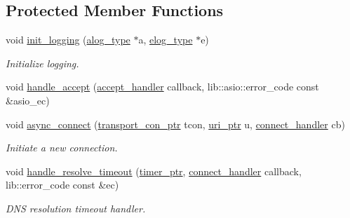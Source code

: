 \subsection*{Protected Member Functions}
\begin{DoxyCompactItemize}
\item 
void \hyperlink{classwebsocketpp_1_1transport_1_1asio_1_1endpoint_a26ad1ad26277ed99a691559e69d47932}{init\+\_\+logging} (\hyperlink{classwebsocketpp_1_1transport_1_1asio_1_1endpoint_acba708e66a47d4aae9a053d364585b81}{alog\+\_\+type} $\ast$a, \hyperlink{classwebsocketpp_1_1transport_1_1asio_1_1endpoint_a2aa93730c801602b55b585121a2898c0}{elog\+\_\+type} $\ast$e)
\begin{DoxyCompactList}\small\item\em Initialize logging. \end{DoxyCompactList}\item 
void \hyperlink{classwebsocketpp_1_1transport_1_1asio_1_1endpoint_a8154dd7191c0d8df984a202bc2e54cf7}{handle\+\_\+accept} (\hyperlink{namespacewebsocketpp_1_1transport_a9326ea831379368ee47841b2e46cb009}{accept\+\_\+handler} callback, lib\+::asio\+::error\+\_\+code const \&asio\+\_\+ec)
\item 
void \hyperlink{classwebsocketpp_1_1transport_1_1asio_1_1endpoint_a1ca12e4d72c691e6cc1ce1f5316e3243}{async\+\_\+connect} (\hyperlink{classwebsocketpp_1_1transport_1_1asio_1_1endpoint_ac5fc306f32d15f92dd1b22366eaba62d}{transport\+\_\+con\+\_\+ptr} tcon, \hyperlink{namespacewebsocketpp_aae370ea5ac83a8ece7712cb39fc23f5b}{uri\+\_\+ptr} u, \hyperlink{namespacewebsocketpp_1_1transport_ac392fca34e946b48414278c0c3addfa5}{connect\+\_\+handler} cb)
\begin{DoxyCompactList}\small\item\em Initiate a new connection. \end{DoxyCompactList}\item 
void \hyperlink{classwebsocketpp_1_1transport_1_1asio_1_1endpoint_ac240587f91cf837babbbb7c48b3cff40}{handle\+\_\+resolve\+\_\+timeout} (\hyperlink{classwebsocketpp_1_1transport_1_1asio_1_1endpoint_a1802f5762009dbed117ff793fa87468f}{timer\+\_\+ptr}, \hyperlink{namespacewebsocketpp_1_1transport_ac392fca34e946b48414278c0c3addfa5}{connect\+\_\+handler} callback, lib\+::error\+\_\+code const \&ec)
\begin{DoxyCompactList}\small\item\em D\+N\+S resolution timeout handler. \end{DoxyCompactList}\item 

\end{DoxyCompactItemize}

